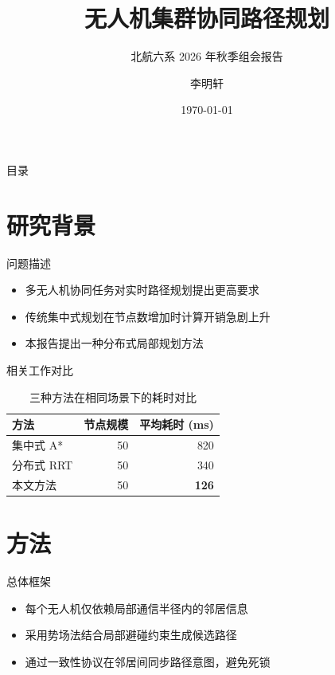 \documentclass{ctexbeamer}
\title{无人机集群协同路径规划}
\subtitle{北航六系 2026 年秋季组会报告}
\author{李明轩}
\date{\today}
\begin{document}
\maketitle

\begin{frame}{目录}
  \tableofcontents
\end{frame}

\section{研究背景}

\begin{frame}{问题描述}
  \begin{itemize}
    \item 多无人机协同任务对实时路径规划提出更高要求
    \item 传统集中式规划在节点数增加时计算开销急剧上升
    \item 本报告提出一种分布式局部规划方法
  \end{itemize}
\end{frame}

\begin{frame}{相关工作对比}
  \begin{table}
    \centering
    \begin{tabular}{lrr}
      \toprule
      方法 & 节点规模 & 平均耗时 (ms) \\
      \midrule
      集中式 A* & 50 & 820 \\
      分布式 RRT & 50 & 340 \\
      本文方法 & 50 & \textbf{126} \\
      \bottomrule
    \end{tabular}
    \caption{三种方法在相同场景下的耗时对比}
  \end{table}
\end{frame}

\section{方法}

\begin{frame}{总体框架}
  \begin{itemize}
    \item 每个无人机仅依赖局部通信半径内的邻居信息
    \item 采用势场法结合局部避碰约束生成候选路径
    \item 通过一致性协议在邻居间同步路径意图，避免死锁
  \end{itemize}
\end{frame}
\end{document}
